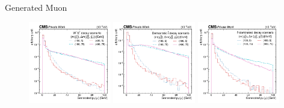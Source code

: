 \begin{frame}[fragile]{Generated Muon \pt}
  \begin{figure}[htpb]
    \centering
    \includegraphics[width=0.32\textwidth]{fig/sig/Sig_wz_GenMuonPt.pdf}
    \includegraphics[width=0.32\textwidth]{fig/sig/Sig_democratic_GenMuonPt.pdf}
    \includegraphics[width=0.32\textwidth]{fig/sig/Sig_stau_GenMuonPt.pdf}
  \end{figure}	
\end{frame}


